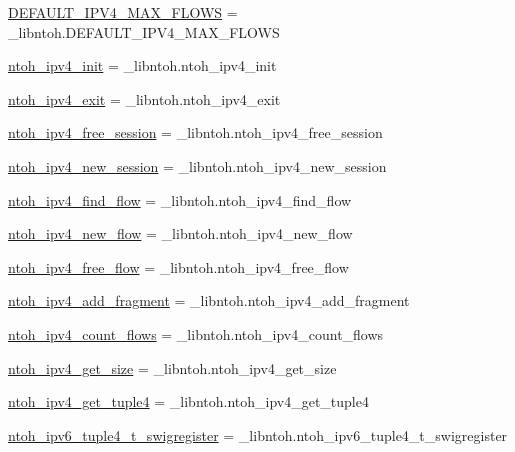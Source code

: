 \begin{DoxyCompactItemize}
\item 
\hyperlink{namespacelibntoh_a12e9b7d82d8b14f9a1df42f0790c5e29}{D\-E\-F\-A\-U\-L\-T\-\_\-\-I\-P\-V4\-\_\-\-M\-A\-X\-\_\-\-F\-L\-O\-W\-S} = \-\_\-libntoh.\-D\-E\-F\-A\-U\-L\-T\-\_\-\-I\-P\-V4\-\_\-\-M\-A\-X\-\_\-\-F\-L\-O\-W\-S
\item 
\hyperlink{namespacelibntoh_afc3c5df10dbfd32a8cb5cb9565136e2a}{ntoh\-\_\-ipv4\-\_\-init} = \-\_\-libntoh.\-ntoh\-\_\-ipv4\-\_\-init
\item 
\hyperlink{namespacelibntoh_a735543d891af207077427f0c240dccca}{ntoh\-\_\-ipv4\-\_\-exit} = \-\_\-libntoh.\-ntoh\-\_\-ipv4\-\_\-exit
\item 
\hyperlink{namespacelibntoh_a94cd2b71068960ad47a915f4db1848ef}{ntoh\-\_\-ipv4\-\_\-free\-\_\-session} = \-\_\-libntoh.\-ntoh\-\_\-ipv4\-\_\-free\-\_\-session
\item 
\hyperlink{namespacelibntoh_adb8d92783d5547e3a13610d735349321}{ntoh\-\_\-ipv4\-\_\-new\-\_\-session} = \-\_\-libntoh.\-ntoh\-\_\-ipv4\-\_\-new\-\_\-session
\item 
\hyperlink{namespacelibntoh_a6ea32ebc3ddff0b34c9a0e61080aa209}{ntoh\-\_\-ipv4\-\_\-find\-\_\-flow} = \-\_\-libntoh.\-ntoh\-\_\-ipv4\-\_\-find\-\_\-flow
\item 
\hyperlink{namespacelibntoh_a134e8c3e980c70bc974cba4092d81ff8}{ntoh\-\_\-ipv4\-\_\-new\-\_\-flow} = \-\_\-libntoh.\-ntoh\-\_\-ipv4\-\_\-new\-\_\-flow
\item 
\hyperlink{namespacelibntoh_a61425564a2195c4e763fd6dec8c5c808}{ntoh\-\_\-ipv4\-\_\-free\-\_\-flow} = \-\_\-libntoh.\-ntoh\-\_\-ipv4\-\_\-free\-\_\-flow
\item 
\hyperlink{namespacelibntoh_afa0f288a3c4d92aab92f3815b4d0c722}{ntoh\-\_\-ipv4\-\_\-add\-\_\-fragment} = \-\_\-libntoh.\-ntoh\-\_\-ipv4\-\_\-add\-\_\-fragment
\item 
\hyperlink{namespacelibntoh_acf3eed60d71b5ee3d6703042e58d67b4}{ntoh\-\_\-ipv4\-\_\-count\-\_\-flows} = \-\_\-libntoh.\-ntoh\-\_\-ipv4\-\_\-count\-\_\-flows
\item 
\hyperlink{namespacelibntoh_a8fef17498e363f0ebe953ae35b162acf}{ntoh\-\_\-ipv4\-\_\-get\-\_\-size} = \-\_\-libntoh.\-ntoh\-\_\-ipv4\-\_\-get\-\_\-size
\item 
\hyperlink{namespacelibntoh_a35799caaa613c17da8de701139da8314}{ntoh\-\_\-ipv4\-\_\-get\-\_\-tuple4} = \-\_\-libntoh.\-ntoh\-\_\-ipv4\-\_\-get\-\_\-tuple4
\item 
\hyperlink{namespacelibntoh_a071ccd4d01c01b7754d7cc5aad4bb494}{ntoh\-\_\-ipv6\-\_\-tuple4\-\_\-t\-\_\-swigregister} = \-\_\-libntoh.\-ntoh\-\_\-ipv6\-\_\-tuple4\-\_\-t\-\_\-swigregister

\end{DoxyCompactItemize}
